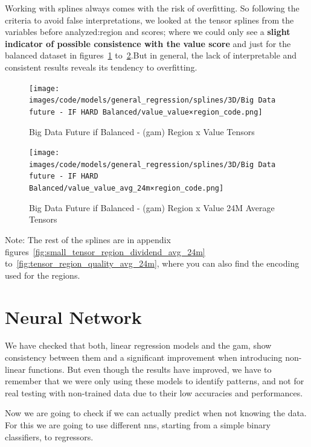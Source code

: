 \documentclass[11pt,english,a4paper,hidelinks]{book}
\begin{document}
\noindent Working with splines always comes with the risk of overfitting. So following the criteria to avoid false interpretations, we looked at the tensor splines from the variables before analyzed:region and scores; where we could only see a \textbf{slight indicator of possible consistence with the value score} and just for the balanced dataset in figures~\ref{fig:tensor_region_value} to~\ref{fig:tensor_region_value_avg_24m}.But in general, the lack of interpretable and consistent results reveals its tendency to overfitting.

\begin{figure}[H]
    \centering
    \texttt{[image: images/code/models/general\_regression/splines/3D/Big Data future - IF HARD Balanced/value\_value×region\_code.png]}
    \caption{Big Data Future \acrshort{if} Balanced - (\acrshort{gam}) Region x Value Tensors}
    \label{fig:tensor_region_value}
\end{figure}

\begin{figure}[H]
    \centering
    \texttt{[image: images/code/models/general\_regression/splines/3D/Big Data future - IF HARD Balanced/value\_value\_avg\_24m×region\_code.png]}
    \caption{Big Data Future \acrshort{if} Balanced - (\acrshort{gam}) Region x Value 24M Average Tensors}
    \label{fig:tensor_region_value_avg_24m}
\end{figure}

Note: The rest of the splines are in appendix figures~\ref{fig:small_tensor_region_dividend_avg_24m} to~\ref{fig:tensor_region_quality_avg_24m}, where you can also find the encoding used for the regions.

\section{Neural Network}

We have checked that both, linear regression models and the \acrshort{gam}, show consistency between them and a significant improvement when introducing non-linear functions. But even though the results have improved, we have to remember that we were only using these models to identify patterns, and not for real testing with non-trained data due to their low accuracies and performances.

\vspace{0.5cm}

\noindent Now we are going to check if we can actually predict when not knowing the data. For this we are going to use different \acrshort{nn}s, starting from a simple binary classifiers, to regressors.
\end{document}
